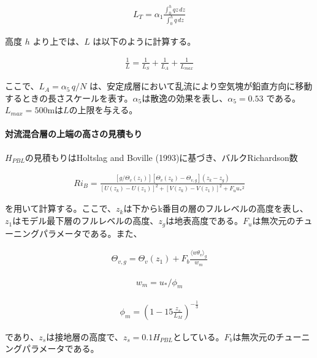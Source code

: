 \begin{eqnarray}L_T=\alpha_1\frac{\displaystyle \int_0^h{qz}\,dz}{\displaystyle \int_0^h{q}\,dz}\end{eqnarray}

高度 \(h\) より上では、\(L\) は以下のように計算する。

\begin{eqnarray}\frac{1}{L}=\frac{1}{L_S}+\frac{1}{L_A}+\frac{1}{L_{max}}\end{eqnarray}

ここで、\(L_A=\alpha_5\,q/N\)
は、安定成層において乱流により空気塊が鉛直方向に移動するときの長さスケールを表す。\(\alpha_5\)は散逸の効果を表し、\(\alpha_5=0.53\)
である。 \(L_{max}=500\)mは\(L\)の上限を与える。

\hypertarget{ux5bfeux6d41ux6df7ux5408ux5c64ux306eux4e0aux7aefux306eux9ad8ux3055ux306eux898bux7a4dux3082ux308a}{%
\paragraph{対流混合層の上端の高さの見積もり}\label{ux5bfeux6d41ux6df7ux5408ux5c64ux306eux4e0aux7aefux306eux9ad8ux3055ux306eux898bux7a4dux3082ux308a}}

\(H_{PBL}\)の見積もりはHoltslag and Boville
(1993)に基づき、バルクRichardson数

\begin{eqnarray}Ri_B=\frac{[g/\Theta_v(z_1)][\Theta_v(z_k)-\Theta_{v,g}](z_k-z_g)}{[U(z_k)-U(z_1)]^2+[V(z_k)-V(z_1)]^2+F_u{u_*}^2}\end{eqnarray}

を用いて計算する。ここで、\(z_k\)は下からk番目の層のフルレベルの高度を表し、\(z_1\)はモデル最下層のフルレベルの高度、\(z_g\)は地表高度である。\(F_u\)は無次元のチューニングパラメータである。また、

\begin{eqnarray}\Theta_{v,g}=\Theta_v(z_1)+F_b \frac{\langle w\theta_v \rangle_g}{w_m}\end{eqnarray}

\begin{eqnarray}w_m=u_*/\phi_m\end{eqnarray}

\begin{eqnarray}\phi_m=\left(1-15\frac{z_s}{L_M}\right)^{-\frac{1}{3}}\end{eqnarray}

であり、\(z_s\)は接地層の高度で、\(z_s=0.1H_{PBL}\)としている。\(F_b\)は無次元のチューニングパラメータである。

